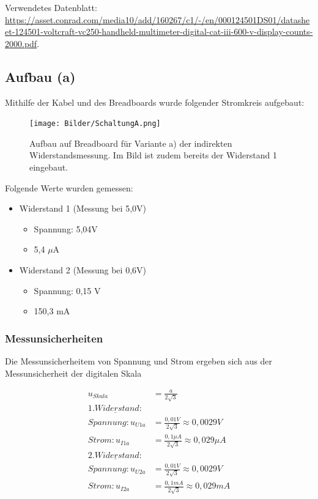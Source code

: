 \documentclass[
  9pt,
]{article}
\begin{document}
Verwendetes Datenblatt:
\url{https://asset.conrad.com/media10/add/160267/c1/-/en/000124501DS01/datasheet-124501-voltcraft-vc250-handheld-multimeter-digital-cat-iii-600-v-display-counts-2000.pdf}.

\hypertarget{aufbau-a}{%
\subsection{Aufbau (a)}\label{aufbau-a}}

Mithilfe der Kabel und des Breadboards wurde folgender Stromkreis
aufgebaut:

\begin{figure}
\centering
\texttt{[image: Bilder/SchaltungA.png]}
\caption{Aufbau auf Breadboard für Variante a) der indirekten
Widerstandsmessung. Im Bild ist zudem bereits der Widerstand 1
eingebaut.}
\end{figure}

Folgende Werte wurden gemessen:

\begin{itemize}
\item {Widerstand 1 (Messung bei 5,0V)}
\begin{itemize}
\item {Spannung: 5,04V}
\item {5,4 $\mu$A}
\end{itemize}
\item {Widerstand 2 (Messung bei 0,6V)}
\begin{itemize}
\item {Spannung: 0,15 V}
\item {150,3 mA}
\end{itemize}
\end{itemize}

\hypertarget{messunsicherheiten}{%
\subsubsection{Messunsicherheiten}\label{messunsicherheiten}}

Die Messunsicherheitem von Spannung und Strom ergeben sich aus der
Messunsicherheit der digitalen Skala

\begin{equation*}
\begin{split}
u_{Skala} &=\frac{a}{2\sqrt{3}} \\
\underline{1.Widerstand:} \\
Spannung: u_{U1a} &= \frac{0,01V}{2\sqrt{3}} \approx 0,0029 V \\
Strom: u_{I1a} &= \frac{0,1\mu A}{2\sqrt{3}} \approx 0,029\mu A \\
\underline{2.Widerstand:} \\
Spannung: u_{U2a} &= \frac{0,01V}{2\sqrt{3}} \approx 0,0029 V \\
Strom: u_{I2a} &= \frac{0,1mA}{2\sqrt{3}} \approx 0,029 mA \\
\end{split}
\end{equation*}
\end{document}
